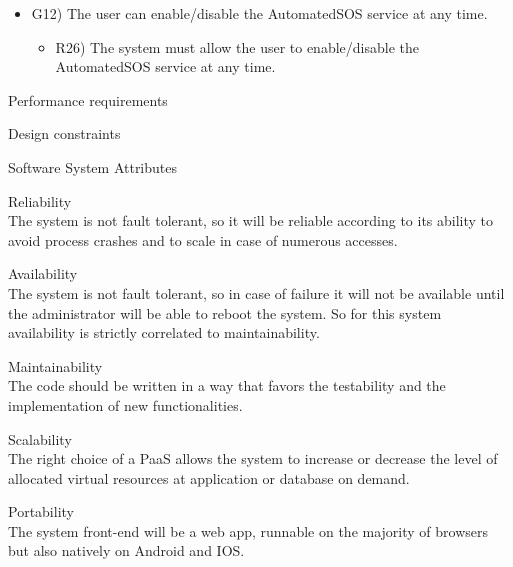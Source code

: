 \documentclass{article}
\begin{document}
\begin{legal}
\begin{legal}
\begin{legal}
\begin{itemize}
{\begin{itemize}
					\end{itemize}
				}
				\item G12) The user can enable/disable the AutomatedSOS service at any time.\\
				{\normalfont
					\begin{itemize}
					\item R26) The system must allow the user to enable/disable the AutomatedSOS service at any time.\\
					\end{itemize}
				}
				\end{itemize}
    		\end{legal}
		\item Performance requirements\\
		\item Design constraints\\
    	\item Software System Attributes \\
		\begin{legal}\bfseries
			\item Reliability\\
			{\normalfont The system is not fault tolerant, so it will be reliable according to its ability to avoid process crashes and to scale in case of numerous accesses.}
			\\
			\item Availability\\
			{\normalfont The system is not fault tolerant, so in case of failure it will not be available until the administrator will be able to reboot the system. So for this system availability is strictly correlated to maintainability.}
			\\
			\item Maintainability\\
			{\normalfont The code should be written in a way that favors the testability and the implementation of new functionalities.}
			\\
			\item Scalability\\
			{\normalfont The right choice of a PaaS allows the system to increase or decrease the level of allocated virtual resources at application or database on demand.}
			\\
			\item Portability\\
			{\normalfont The system front-end will be a web app, runnable on the majority of browsers but also natively on Android and IOS.}

\end{legal}
\end{legal}
\end{legal}
\end{document}
